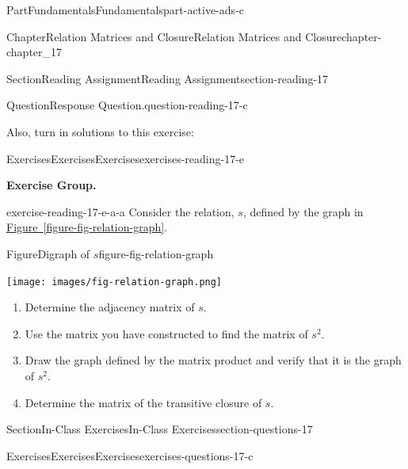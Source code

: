 \documentclass[oneside,10pt,]{book}
\newcommand{\xreffont}{\relax}
\numberwithin{equation}{section}
\begin{document}
\begin{partptx}{Part}{Fundamentals}{}{Fundamentals}{}{}{part-active-ads-c}
\begin{chapterptx}{Chapter}{Relation Matrices and Closure}{}{Relation Matrices and Closure}{}{}{chapter-chapter_17}
\begin{sectionptx}{Section}{Reading Assignment}{}{Reading Assignment}{}{}{section-reading-17}
\begin{question}{Question}{Response Question.}{question-reading-17-c}
\end{question}
Also, turn in solutions to this exercise:%
%
%
\typeout{************************************************}
\typeout{************************************************}
%
\begin{exercises-subsection-numberless}{Exercises}{Exercises}{}{Exercises}{}{}{exercises-reading-17-e}
\par\medskip\noindent%
\textbf{Exercise Group.}\space\space%
\begin{exercisegroup}
\begin{divisionexerciseeg}{1}{}{}{exercise-reading-17-e-a-a}%
Consider the relation, \(s\), defined by the graph in \hyperref[figure-fig-relation-graph]{Figure~{\xreffont\ref{figure-fig-relation-graph}}}.%
\begin{figureptx}{Figure}{Digraph of \(s\)}{figure-fig-relation-graph}{}%
\begin{image}{0.25}{0.5}{0.25}{}%
\texttt{[image: images/fig-relation-graph.png]}
\end{image}%
\tcblower
\end{figureptx}%
%
\begin{enumerate}[label=(\alph*)]
\item{}Determine the adjacency matrix of \(s\).%
\item{}Use the matrix you have constructed to find the matrix of \(s^2\).%
\item{}Draw the graph defined by the matrix product and verify that it is the graph of \(s^2\).%
\item{}Determine the matrix of the transitive closure of \(s\).%
\end{enumerate}
%
\end{divisionexerciseeg}%
\end{exercisegroup}
\par\medskip\noindent
\end{exercises-subsection-numberless}
\end{sectionptx}
%
%
\typeout{************************************************}
\typeout{************************************************}
%
\begin{sectionptx}{Section}{In-Class Exercises}{}{In-Class Exercises}{}{}{section-questions-17}
%
%
%
\typeout{************************************************}
\typeout{************************************************}
%
\begin{exercises-subsection-numberless}{Exercises}{Exercises}{}{Exercises}{}{}{exercises-questions-17-c}

\end{exercises-subsection-numberless}
\end{sectionptx}
\end{chapterptx}
\end{partptx}
\end{document}
